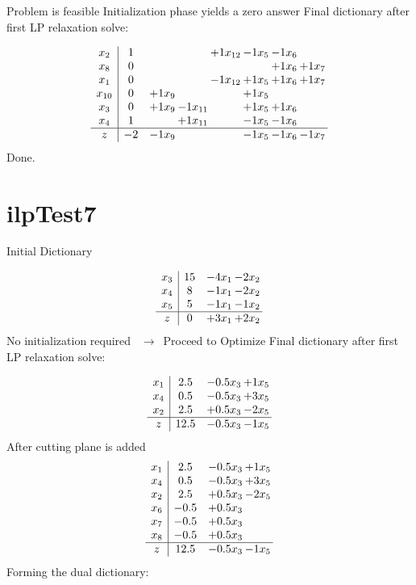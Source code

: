 \documentclass[11pt]{article}
\begin{document}
 Problem is feasible Initialization phase yields a zero answer 
Final dictionary after first LP relaxation solve: 

\[\begin{array}{c| c c@{\hskip 2pt} c@{\hskip 2pt} c@{\hskip 2pt} c@{\hskip 2pt} c@{\hskip 2pt} c@{\hskip 2pt} }
 x_{2}   &  1  &    &   & + 1 x_{12} & -1 x_{5} & -1 x_{6} &   \\
 x_{8}   &  0  &    &    &    &   & + 1 x_{6} & + 1 x_{7}\\
 x_{1}   &  0  &    &   & -1 x_{12} & + 1 x_{5} & + 1 x_{6} & + 1 x_{7}\\
 x_{10}   &  0 & + 1 x_{9} &    &   & + 1 x_{5} &    &   \\
 x_{3}   &  0 & + 1 x_{9} & -1 x_{11} &   & + 1 x_{5} & + 1 x_{6} &   \\
 x_{4}   &  1  &   & + 1 x_{11} &   & -1 x_{5} & -1 x_{6} &   \\
\hline
z    &  -2 & -1 x_{9} &    &   & -1 x_{5} & -1 x_{6} & -1 x_{7}\\
\end{array}\]
Done.
\section{ilpTest7}

Initial Dictionary 

\[\begin{array}{c| c c@{\hskip 2pt} c@{\hskip 2pt} }
 x_{3}   &  15 & -4 x_{1} & -2 x_{2}\\
 x_{4}   &  8 & -1 x_{1} & -2 x_{2}\\
 x_{5}   &  5 & -1 x_{1} & -1 x_{2}\\
\hline
z    &  0 & + 3 x_{1} & + 2 x_{2}\\
\end{array}\]
No initialization required \ $\rightarrow$\  Proceed to Optimize 
Final dictionary after first LP relaxation solve: 

\[\begin{array}{c| c c@{\hskip 2pt} c@{\hskip 2pt} }
 x_{1}   &  2.5 & -0.5 x_{3} & + 1 x_{5}\\
 x_{4}   &  0.5 & -0.5 x_{3} & + 3 x_{5}\\
 x_{2}   &  2.5 & + 0.5 x_{3} & -2 x_{5}\\
\hline
z    &  12.5 & -0.5 x_{3} & -1 x_{5}\\
\end{array}\]
 After cutting plane is added 
\[\begin{array}{c| c c@{\hskip 2pt} c@{\hskip 2pt} }
 x_{1}   &  2.5 & -0.5 x_{3} & + 1 x_{5}\\
 x_{4}   &  0.5 & -0.5 x_{3} & + 3 x_{5}\\
 x_{2}   &  2.5 & + 0.5 x_{3} & -2 x_{5}\\
 x_{6}   &  -0.5 & + 0.5 x_{3} &   \\
 x_{7}   &  -0.5 & + 0.5 x_{3} &   \\
 x_{8}   &  -0.5 & + 0.5 x_{3} &   \\
\hline
z    &  12.5 & -0.5 x_{3} & -1 x_{5}\\
\end{array}\]
Forming the dual dictionary:
\end{document}
